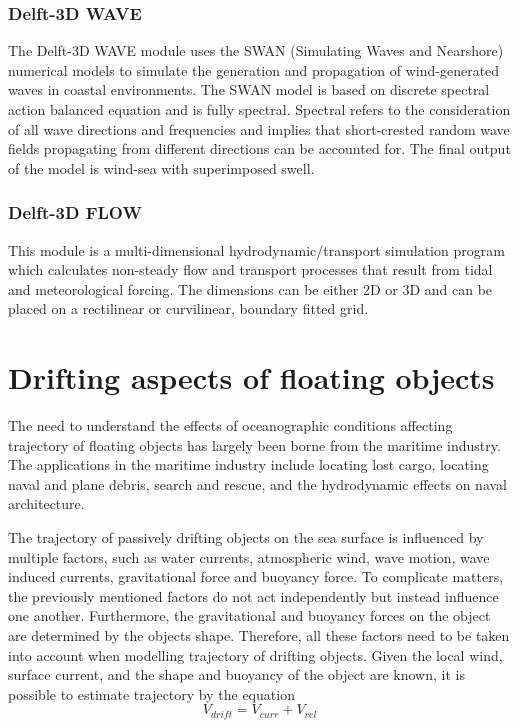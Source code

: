\documentclass[
]{article}
\begin{document}
\hypertarget{delft-3d-wave}{%
\subsubsection{Delft-3D WAVE}\label{delft-3d-wave}}

The Delft-3D WAVE module uses the SWAN (Simulating Waves and Nearshore)
numerical models to simulate the generation and propagation of
wind-generated waves in coastal environments. The SWAN model is based on
discrete spectral action balanced equation and is fully spectral.
Spectral refers to the consideration of all wave directions and
frequencies and implies that short-crested random wave fields
propagating from different directions can be accounted for. The final
output of the model is wind-sea with superimposed swell.

\hypertarget{delft-3d-flow}{%
\subsubsection{Delft-3D FLOW}\label{delft-3d-flow}}

This module is a multi-dimensional hydrodynamic/transport simulation
program which calculates non-steady flow and transport processes that
result from tidal and meteorological forcing. The dimensions can be
either 2D or 3D and can be placed on a rectilinear or curvilinear,
boundary fitted grid.

\hypertarget{drifting-aspects-of-floating-objects}{%
\section{Drifting aspects of floating
objects}\label{drifting-aspects-of-floating-objects}}

The need to understand the effects of oceanographic conditions affecting
trajectory of floating objects has largely been borne from the maritime
industry. The applications in the maritime industry include locating
lost cargo, locating naval and plane debris, search and rescue, and the
hydrodynamic effects on naval architecture.

The trajectory of passively drifting objects on the sea surface is
influenced by multiple factors, such as water currents, atmospheric
wind, wave motion, wave induced currents, gravitational force and
buoyancy force. To complicate matters, the previously mentioned factors
do not act independently but instead influence one another. Furthermore,
the gravitational and buoyancy forces on the object are determined by
the objects shape. Therefore, all these factors need to be taken into
account when modelling trajectory of drifting objects. Given the local
wind, surface current, and the shape and buoyancy of the object are
known, it is possible to estimate trajectory by the equation
\[V_{drift}=V_{curr} + V_{rel}\]
\end{document}
